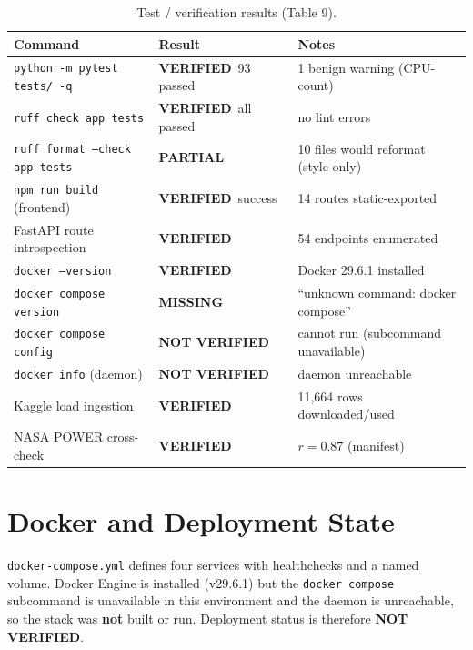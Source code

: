\documentclass[11pt,a4paper]{article}
\newcommand{\stV}{\textcolor{cok}{\textbf{VERIFIED}}}
\newcommand{\stP}{\textcolor{cpart}{\textbf{PARTIAL}}}
\newcommand{\stM}{\textcolor{cmiss}{\textbf{MISSING}}}
\newcommand{\stNV}{\textcolor{cnv}{\textbf{NOT VERIFIED}}}
\newcommand{\code}[1]{\texttt{\small #1}}
\begin{document}
\begin{table}[H]
\centering
\caption{Test / verification results (Table 9).}
\label{tab:tests}
\footnotesize
\begin{tabular}{@{}p{4.6cm}p{3.0cm}p{5.0cm}@{}}
\toprule
\textbf{Command} & \textbf{Result} & \textbf{Notes}\\
\midrule
\code{python -m pytest tests/ -q} & \stV\ 93 passed & 1 benign warning (CPU-count)\\
\code{ruff check app tests} & \stV\ all passed & no lint errors\\
\code{ruff format --check app tests} & \stP & 10 files would reformat (style only)\\
\code{npm run build} (frontend) & \stV\ success & 14 routes static-exported\\
FastAPI route introspection & \stV & 54 endpoints enumerated\\
\code{docker --version} & \stV & Docker 29.6.1 installed\\
\code{docker compose version} & \stM & ``unknown command: docker compose''\\
\code{docker compose config} & \stNV & cannot run (subcommand unavailable)\\
\code{docker info} (daemon) & \stNV & daemon unreachable\\
Kaggle load ingestion & \stV & 11{,}664 rows downloaded/used\\
NASA POWER cross-check & \stV & $r=0.87$ (manifest)\\
\bottomrule
\end{tabular}
\end{table}

\section{Docker and Deployment State}
\code{docker-compose.yml} defines four services with healthchecks and a named volume.
Docker Engine is installed (v29.6.1) but the \code{docker compose} subcommand is
unavailable in this environment and the daemon is unreachable, so the stack was
\textbf{not} built or run. Deployment status is therefore \stNV.
\end{document}
